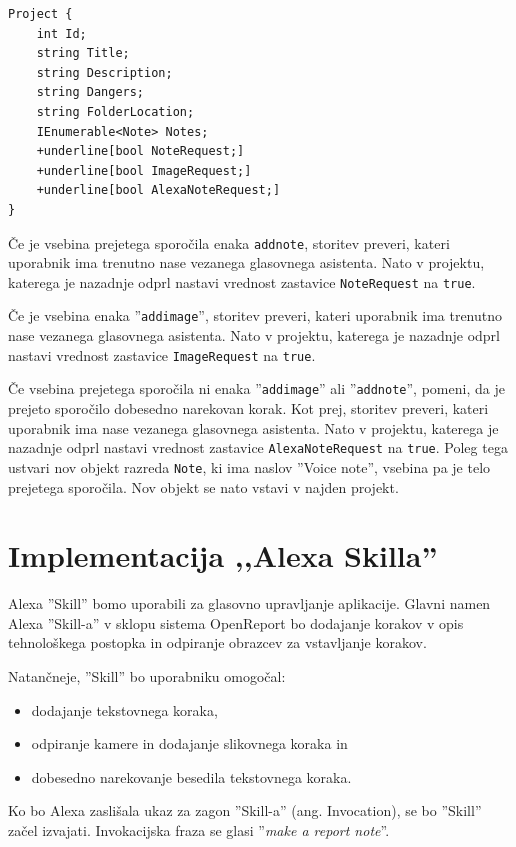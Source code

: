 \documentclass[a4paper, 12pt]{book}
\begin{document}
\begin{Verbatim}[commandchars=+\[\]]
Project { 
    int Id; 
    string Title; 
    string Description; 
    string Dangers; 
    string FolderLocation; 
    IEnumerable<Note> Notes; 
    +underline[bool NoteRequest;] 
    +underline[bool ImageRequest;] 
    +underline[bool AlexaNoteRequest;] 
}
\end{Verbatim}


Če je vsebina prejetega sporočila enaka \texttt{addnote}, storitev preveri, kateri uporabnik ima trenutno nase vezanega glasovnega asistenta.
Nato v projektu, katerega je nazadnje odprl nastavi vrednost zastavice \texttt{NoteRequest} na \texttt{true}.


Če je vsebina enaka ''\texttt{addimage}'', storitev preveri, kateri uporabnik ima trenutno nase vezanega glasovnega asistenta.
Nato v projektu, katerega je nazadnje odprl nastavi vrednost zastavice \texttt{ImageRequest} na \texttt{true}.

Če vsebina prejetega sporočila ni enaka ''\texttt{addimage}'' ali ''\texttt{addnote}'', pomeni, da je prejeto sporočilo dobesedno narekovan korak.
Kot prej, storitev preveri, kateri uporabnik ima nase vezanega glasovnega asistenta.
Nato v projektu, katerega je nazadnje odprl nastavi vrednost zastavice \texttt{AlexaNoteRequest} na \texttt{true}.
Poleg tega ustvari nov objekt razreda \texttt{Note}, ki ima naslov ''Voice note'', vsebina pa je telo prejetega sporočila.
Nov objekt se nato vstavi v najden projekt.




\section{Implementacija ,,Alexa Skilla''}

Alexa ''Skill'' bomo uporabili za glasovno upravljanje aplikacije.
Glavni namen Alexa ''Skill-a'' v sklopu sistema OpenReport bo dodajanje korakov v opis tehnološkega postopka in odpiranje obrazcev za vstavljanje korakov.

\noindent Natančneje, ''Skill'' bo uporabniku omogočal:
\begin{itemize}
	\item dodajanje tekstovnega koraka,
	\item odpiranje kamere in dodajanje slikovnega koraka in
	\item dobesedno narekovanje besedila tekstovnega koraka.
\end{itemize}

Ko bo Alexa zaslišala ukaz za zagon ''Skill-a'' (ang. Invocation), se bo ''Skill'' začel izvajati.
Invokacijska fraza se glasi ''\textit{make a report note}''.
\end{document}
